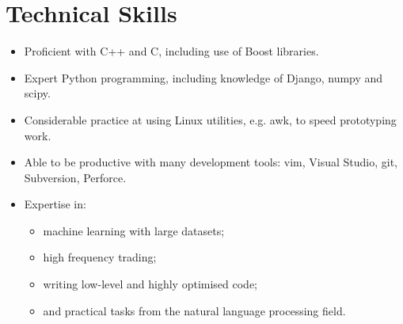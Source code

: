 \documentclass[]{article}
\begin{document}
\begin{comment}
\textbf{Most Recent Grades}\\

\begin{table*}[h]
\begin{tabular}[]{p{0.5cm}p{10.3cm}p{3.5cm}l}
& \underline{Honours Year} & \\
&Overall Honours Mark & \textit{First Class}\\
&Honours Thesis & \textit{High Distinction}\\

&Data Mining and Machine Learning & \textit{Distinction}\\

&Statistical Natural Language Processing & \textit{High
  Distinction}\\ 

&IT Research Methods & \textit{High Distinction}\\

&Network-Based High Performance Computing & \textit{Distinction} \\

&Advanced Technologies for Learning & \textit{Distinction}\\

\end{tabular}
\end{table*}
\end{comment}


\section*{Technical Skills}

\begin{itemize}
\item {Proficient with C++ and C, including use of Boost libraries.}
\item {Expert Python programming, including knowledge of Django, numpy and scipy.}
\item {Considerable practice at using Linux utilities, e.g. awk, to speed prototyping work.}
\item {Able to be productive with many development tools: vim, Visual Studio, git, Subversion, Perforce.}
\item {Expertise in:}
	\begin{itemize}
	\item {machine learning with large datasets;}
	\item {high frequency trading;}
	\item {writing low-level and highly optimised code;}
	\item {and practical tasks from the natural language processing field.}
	\end{itemize}
\end{itemize}
\end{document}
